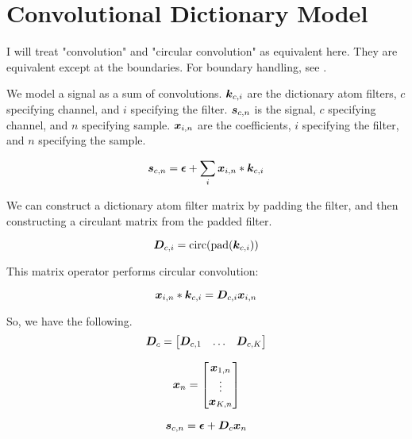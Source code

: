 \documentclass{article}
\begin{document}
\section{Convolutional Dictionary Model}

I will treat "convolution" and "circular convolution" as equivalent here. They are equivalent except at the boundaries. For boundary handling, see \cite{wohlberg2016boundary}.

We model a signal as a sum of convolutions. $\bm{k}_{c,i}$ are the dictionary atom filters, $c$ specifying channel, and $i$ specifying the filter. $\bm{s}_{c,n}$ is the signal, $c$ specifying channel, and $n$ specifying sample. $\bm{x}_{i,n}$ are the coefficients, $i$ specifying the filter, and $n$ specifying the sample.

\begin{equation}
\bm{s}_{c,n} = \bm{\epsilon} + \sum_{i} \bm{x}_{i,n} * \bm{k}_{c,i}
\end{equation}


We can construct a dictionary atom filter matrix by padding the filter, and then constructing a circulant matrix from the padded filter.

\begin{equation}
\bm{D}_{c,i} = \operatorname{circ}(\operatorname{pad}(\bm{k}_{c,i}))
\end{equation}

This matrix operator performs circular convolution:

\begin{equation}
\bm{x}_{i,n} * \bm{k}_{c,i} = \bm{D}_{c,i}\bm{x}_{i,n}
\end{equation}

So, we have the following.
\begin{equation}
\bm{D}_c = \begin{bmatrix} \bm{D}_{c,1} & \hdots & \bm{D}_{c,K} \end{bmatrix}
\end{equation}

\begin{equation}
\bm{x}_n = \begin{bmatrix} \bm{x}_{1,n} \\
                      \vdots \\ 
                      \bm{x}_{K,n} 
      \end{bmatrix}
\end{equation}

\begin{equation}
\bm{s}_{c,n} = \bm{\epsilon} + \bm{D}_c\bm{x}_n
\end{equation}
\end{document}

